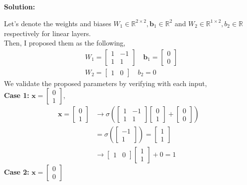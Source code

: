 \documentclass{article}
\newenvironment{solution}
  {\par\noindent\textbf{Solution:}\par}
  {\par}
\begin{document}
\subsection{}
\begin{solution}
Let's denote the weights and biases $W_1 \in \mathbb{R}^{2\times 2},\textbf{b}_1 \in \mathbb{R}^2$ and $W_2 \in \mathbb{R}^{1 \times 2}, b_2 \in \mathbb{R}$ respectively for linear layers.
\\ 
Then, I proposed them as the following, 
\[ 
\begin{aligned}
&W_{1} = \begin{bmatrix}
1 & -1 \\
1 & 1
\end{bmatrix} \quad \textbf{b}_{1} = \begin{bmatrix}
0 \\
0
\end{bmatrix} \\ 
&W_{2} = \begin{bmatrix}
1 & 0
\end{bmatrix} \quad b_{2} = 0
\end{aligned}
\]
We validate the proposed parameters by verifying with each input,
\\ 
\textbf{Case 1:} $\mathbf{x}= \begin{bmatrix}
0 \\
1
\end{bmatrix}$,
\[ 
\begin{aligned}
\mathbf{x}= \begin{bmatrix}
0 \\
1
\end{bmatrix} &\to \sigma(\begin{bmatrix}
1 & -1  \\
1 & 1
\end{bmatrix}\begin{bmatrix}
0 \\
1
\end{bmatrix} + \begin{bmatrix}
0 \\
0
\end{bmatrix}) \\
&= \sigma(\begin{bmatrix}
-1  \\
1
\end{bmatrix}) = \begin{bmatrix}
1 \\
1
\end{bmatrix} \\ 
&\to \begin{bmatrix}
1 & 0
\end{bmatrix}\begin{bmatrix}
1 \\
1
\end{bmatrix}+0 = 1
\end{aligned}
\]
\textbf{Case 2:} $\mathbf{x}= \begin{bmatrix}
0 \\
0
\end{bmatrix}$


\end{solution}
\end{document}
